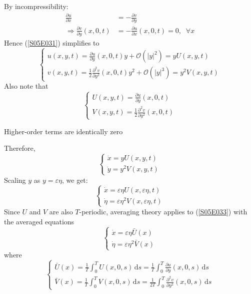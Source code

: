 \documentclass[twoside,10pt,a4paper]{article}
\begin{document}
By incompressibility:
\begin{align*}
	\frac{\partial u}{\partial x} &= - \frac{\partial v}{\partial y} \\
	\Longrightarrow \frac{\partial v}{\partial y}(x,0,t) &= - \frac{\partial u}{\partial x}(x,0,t) = 0, \;\; \forall x
\end{align*}
Hence (\ref{S05E031}) simplifies to
\begin{equation*}
	\begin{cases}
		\displaystyle u(x,y,t) = \frac{\partial u}{\partial y}(x,0,t)y + \mathcal{O}(|y|^2) = y U(x,y,t) \\
		\displaystyle v(x,y,t) = \frac{1}{2} \frac{\partial^2 v}{\partial y^2}(x,0,t)y^2 + \mathcal{O}(|y|^3) = y^2V(x,y,t)
	\end{cases}
\end{equation*}
Also note that
\begin{equation}\label{S05E032}
	\begin{cases}
		\displaystyle U(x,y,t) = \frac{\partial u}{\partial y}(x,0,t) \\
		\displaystyle V(x,y,t) = \frac{1}{2}\frac{\partial^2 v}{\partial y^2}(x,0,t)
	\end{cases}
\end{equation}
\begin{center}
	\color{red} Higher-order terms are identically zero
\end{center}
Therefore,
\begin{equation*}
	\begin{cases}
		\dot{x} = yU(x,y,t) \\
		\dot{y} = y^2V(x,y,t)
	\end{cases}
\end{equation*}
Scaling $y$ as $y = \varepsilon \eta$, we get:
\begin{equation}\label{S05E033}
	\begin{cases}
		\dot{x} = \varepsilon \eta U(x,\varepsilon \eta, t) \\
		\dot{\eta} = \varepsilon \eta^2 V(x, \varepsilon \eta,t)
	\end{cases}
\end{equation}
Since $U$ and $V$ are also $T$-periodic, averaging theory applies to (\ref{S05E033}) with the averaged equations
\begin{equation}\label{S05E034}
	\begin{cases}
		\dot{x} = \varepsilon \eta \bar{U}(x) \\
		\dot{\eta} = \varepsilon \eta^2 \bar{V}(x)
	\end{cases}
\end{equation}
where
\begin{equation}\label{S05E035}
	\begin{cases}
		\displaystyle \bar{U}(x) = \frac{1}{T} \int_0^T U(x,0,s)\,\text{d}s = \frac{1}{T} \int_0^T \frac{\partial u}{\partial y}(x,0,s)\,\text{d}s \\
		\displaystyle \bar{V}(x) = \frac{1}{T} \int_0^T V(x,0,s)\,\text{d}s = \frac{1}{2T} \int_0^T \frac{\partial^2 v}{\partial y^2}(x,0,s)\,\text{d}s
	\end{cases}
\end{equation}
\end{document}
